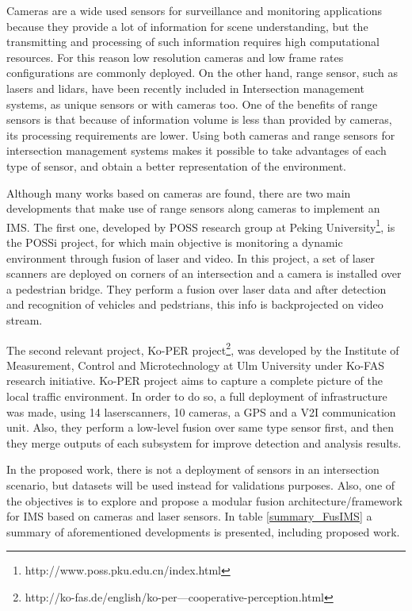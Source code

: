 Cameras are a wide used sensors for surveillance and monitoring applications because they provide a lot of information for scene understanding, but the transmitting and processing of such information requires high computational resources. For this reason low resolution cameras and low frame rates configurations are commonly deployed. On the other hand, range sensor, such as lasers and lidars, have been recently included in Intersection management systems, as unique sensors or with cameras too. One of the benefits of range sensors is that because of information volume is less than provided by cameras, its processing requirements are lower. Using both cameras and range sensors for intersection management systems makes it possible to take advantages of each type of sensor, and obtain a better representation of the environment.

Although many works based on cameras are found, there are two main developments that make use of range sensors along cameras to implement an IMS. The first one, developed by POSS research group at Peking University\footnote{http://www.poss.pku.edu.cn/index.html}, is the POSSi project, for which main objective is monitoring a dynamic environment through fusion of laser and video. In this project, a set of laser scanners are deployed on corners of an intersection and a camera is installed over a pedestrian bridge. They perform a fusion over laser data and after detection and recognition of vehicles and pedstrians, this info is backprojected on video stream.

The second relevant project, Ko-PER project\footnote{http://ko-fas.de/english/ko-per---cooperative-perception.html}, was developed by the Institute of Measurement, Control and Microtechnology at Ulm University under Ko-FAS research initiative. Ko-PER project aims to capture a complete picture of the local traffic environment. In order to do so, a full deployment of infrastructure was made, using 14 laserscanners, 10 cameras, a GPS and a V2I communication unit. Also, they perform a low-level fusion over same type sensor first, and then they merge outputs of each subsystem for improve detection and analysis results.

In the proposed work, there is not a deployment of sensors in an intersection scenario, but datasets will be used instead for validations purposes. Also, one of the objectives is to explore and propose a modular fusion architecture/framework for IMS based on cameras and laser sensors. In table \ref{summary_FusIMS} a summary of aforementioned developments is presented, including proposed work.

